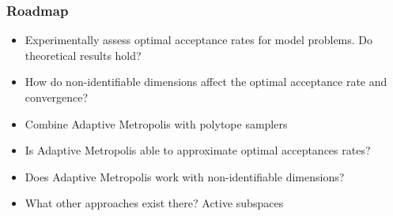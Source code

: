 %		    
%

\begin{frame}[c]
    \frametitle{Roadmap}
    \begin{itemize}
	\item Experimentally assess optimal acceptance rates for model problems. Do theoretical results hold?
	\item How do non-identifiable dimensions affect the optimal acceptance rate and convergence?
	\item Combine Adaptive Metropolis with polytope samplers
	\item Is Adaptive Metropolis able to approximate optimal acceptances rates? 
	\item Does Adaptive Metropolis work with non-identifiable dimensions?
	\item What other approaches exist there? Active subspaces \cite{Constantine_2016}
    \end{itemize}
\end{frame}

